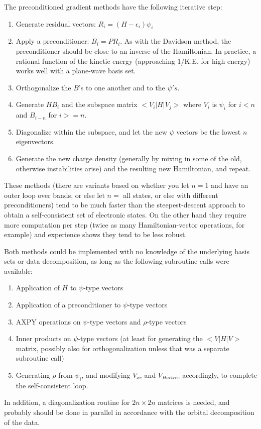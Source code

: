 The preconditioned gradient methods have the following iterative step:
\begin{enumerate}
\item Generate residual vectors: $ R_i = (H - \epsilon_i) \psi_i$
\item Apply a preconditioner: $B_i = P R_i$. As with the
Davidson method, the preconditioner should be close to an inverse
of the Hamiltonian.  In practice, a rational function of the kinetic
energy (approaching 1/K.E. for high energy) works well with a
plane-wave basis set.
\item Orthogonalize the $B$'s to one another and to the $\psi's$.
\item Generate $ H B_i $ and the subspace matrix  $ <V_i|H|V_j>$ where
$V_i$ is $\psi_i$ for $i < n$ and $B_{i - n}$ for $i >= n$.
\item Diagonalize within the subspace, and let the new $\psi$ vectors
be the lowest $n$ eigenvectors.
\item Generate the new charge density (generally by mixing in some
of the old, otherwise instabilities arise) and the resulting new
Hamiltonian, and repeat.
\end{enumerate}
These methods (there are variants based on whether you let $n = 1$ and
have an outer loop over bands, or else let $n =$ all states, or else
with different preconditioners) tend to be much faster than the
steepest-descent approach to obtain a self-consistent set of electronic
states. On the other hand they require more computation per step
(twice as many Hamiltonian-vector operations, for example) and experience
shows they tend to be less robust.

Both methods could be implemented with no knowledge of the
underlying basis sets or data decomposition, as long as the
following subroutine calls were available:
\begin{enumerate}
\item Application of $H$ to $\psi$-type vectors
\item Application of a preconditioner to $\psi$-type vectors
\item AXPY operations on $\psi$-type vectors and $\rho$-type vectors
\item Inner products on $\psi$-type vectors (at least for
generating the $<V|H|V>$ matrix, possibly also for orthogonalization unless
that was a separate subroutine call)
\item Generating $\rho$ from $\psi_i$, and modifying $V_{xc}$ and $V_{Hartree}$
accordingly, to complete the self-consistent loop.
\end{enumerate}
In addition, a diagonalization routine for $2 n\times 2 n$ matrices is
needed, and probably should be done in parallel in accordance with
the orbital decomposition of the data.

